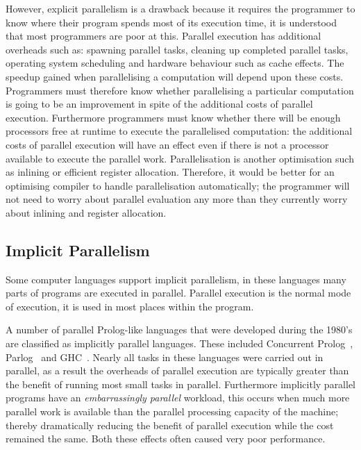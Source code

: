 However, explicit parallelism is a drawback because it requires the
programmer to know where their program spends most of its execution
time, it is understood that most programmers are poor at this.
Parallel execution has additional overheads such as:
spawning parallel tasks,
cleaning up completed parallel tasks,
operating system scheduling and
hardware behaviour such as cache effects.
The speedup gained when parallelising a computation will depend upon
these costs.
Programmers must therefore know whether parallelising a particular
computation is going to be an improvement in spite of the additional
costs of parallel execution.
Furthermore programmers must know whether there will be enough
processors free at runtime to execute the parallelised computation:
the additional costs of parallel execution will have an effect even
if there is not a processor available to execute the parallel work.
Parallelisation is another optimisation such as inlining or efficient
register allocation.
Therefore,
it would be better for an optimising compiler to handle parallelisation
automatically;
the programmer will not need to worry about parallel evaluation any more
than they currently worry about inlining and register allocation.

\subsection{Implicit Parallelism}
\label{sec:intro_implicit_par}

Some computer languages support implicit parallelism,
in these languages many parts of programs are executed in parallel.
Parallel execution is the normal mode of execution,
it is used in most places within the program.

A number of parallel Prolog-like languages that were developed during the
1980's are classified as implicitly parallel languages.
These included Concurrent
Prolog~\citep{saraswat85:probl_with_concur_prolog,saraswat86:concurrent_prolog_definition,shapiro:flat_concur_prolog},
Parlog~\citep{clark:84:parlog_sys_prog,clark:86:parlog} and GHC~\citep{ueda:ghc}.
Nearly all tasks in these languages were carried out in
parallel,
as a result the overheads of parallel execution are typically
greater than the benefit of running most small tasks in parallel.
Furthermore implicitly parallel programs have an \emph{embarrassingly
  parallel} workload,
this occurs when much more parallel work is available than the parallel
processing capacity of the machine;
thereby dramatically reducing the benefit of parallel execution while
the cost remained the same.
Both these effects often caused very poor performance.


